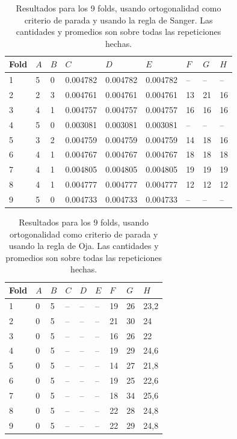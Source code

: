 \documentclass[informe.tex]{subfiles}
\begin{document}
	
	\begin{table}[H]
	  \centering
	  \begin{tabular}{|l|l|l|l|l|l|l|l|l|} \hline
	  Fold & $A$ & $B$ & $C$ & $D$ & $E$ & $F$ & $G$ & $H$ \\ \hline
	  1& 5 & 0 & 0.004782 & 0.004782 & 0.004782 & -- & -- & -- \\ \hline
	  2& 2 & 3 & 0.004761 & 0.004761 & 0.004761 & 13 & 21 & 16 \\ \hline
	  3& 4 & 1 & 0.004757 & 0.004757 & 0.004757 & 16 & 16 & 16 \\ \hline
	  4& 5 & 0 & 0.003081 & 0.003081 & 0.003081 & -- & -- & -- \\ \hline
	  5& 3 & 2 & 0.004759 & 0.004759 & 0.004759 & 14 & 18 & 16 \\ \hline
	  6& 4 & 1 & 0.004767 & 0.004767 & 0.004767 & 18 & 18 & 18 \\ \hline
	  7& 4 & 1 & 0.004805 & 0.004805 & 0.004805 & 19 & 19 & 19 \\ \hline
	  8& 4 & 1 & 0.004777 & 0.004777 & 0.004777 & 12 & 12 & 12 \\ \hline
	  9& 5 & 0 & 0.004733 & 0.004733 & 0.004733 & -- & -- & -- \\ \hline
	  \end{tabular}
	  \caption{Resultados para los 9 folds, usando ortogonalidad como criterio de parada y usando la regla de Sanger. Las cantidades y promedios son sobre todas las repeticiones hechas.}
	  \label{tab:ortogonalidad_sanger250}
	\end{table}

	
	\begin{table}[H]
	  \centering
	  \begin{tabular}{|l|l|l|l|l|l|l|l|l|} \hline
	  Fold & $A$ & $B$ & $C$ & $D$ & $E$ & $F$ & $G$ & $H$ \\ \hline
	  1& 0 & 5 & -- & -- & -- & 19 & 26 & 23,2 \\ \hline
	  2& 0 & 5 & -- & -- & -- & 21 & 30 & 24 \\ \hline
	  3& 0 & 5 & -- & -- & -- & 16 & 26 & 22 \\ \hline
	  4& 0 & 5 & -- & -- & -- & 19 & 29 & 24,6 \\ \hline
	  5& 0 & 5 & -- & -- & -- & 14 & 27 & 21,8 \\ \hline
	  6& 0 & 5 & -- & -- & -- & 19 & 25 & 22,6 \\ \hline
	  7& 0 & 5 & -- & -- & -- & 18 & 34 & 25,6 \\ \hline
	  8& 0 & 5 & -- & -- & -- & 22 & 28 & 24,8 \\ \hline
	  9& 0 & 5 & -- & -- & -- & 22 & 29 & 24,8 \\ \hline
	  \end{tabular}
	  \caption{Resultados para los 9 folds, usando ortogonalidad como criterio de parada y usando la regla de Oja. Las cantidades y promedios son sobre todas las repeticiones hechas.}
	  \label{tab:ortogonalidad_oja250}
	\end{table}
\end{document}
